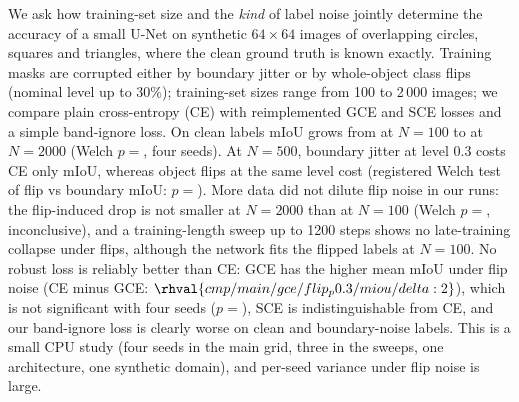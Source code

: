 We ask how training-set size and the \emph{kind} of label noise jointly determine the accuracy of a small U-Net on synthetic $64\times64$ images of overlapping circles, squares and triangles, where the clean ground truth is known exactly. Training masks are corrupted either by boundary jitter or by whole-object class flips (nominal level up to 30\%); training-set sizes range from 100 to 2\,000 images; we compare plain cross-entropy (CE) with reimplemented GCE and SCE losses and a simple band-ignore loss. On clean labels mIoU grows from  at $N=100$ to  at $N=2000$ (Welch $p=$, four seeds). At $N=500$, boundary jitter at level 0.3 costs CE only  mIoU, whereas object flips at the same level cost  (registered Welch test of flip vs boundary mIoU: $p=$). More data did not dilute flip noise in our runs: the flip-induced drop is not smaller at $N=2000$ than at $N=100$ (Welch $p=$, inconclusive), and a training-length sweep up to 1200 steps shows no late-training collapse under flips, although the network fits the flipped labels at $N=100$. No robust loss is reliably better than CE: GCE has the higher mean mIoU under flip noise (CE minus GCE: $\rhval{cmp/main/gce/flip_p0.3/miou/delta:2}$), which is not significant with four seeds ($p=$), SCE is indistinguishable from CE, and our band-ignore loss is clearly worse on clean and boundary-noise labels. This is a small CPU study (four seeds in the main grid, three in the sweeps, one architecture, one synthetic domain), and per-seed variance under flip noise is large.
